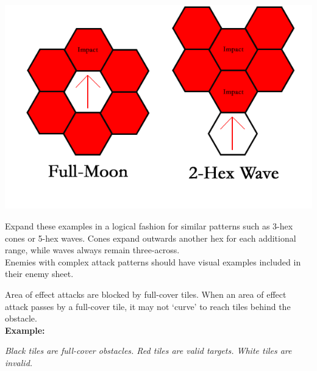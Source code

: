 \documentclass[12pt]{article}
\begin{document}
\begin{multicols*}{2}
\begin{center}
{\includegraphics[scale=0.37]{misc/aoes_3.png}}
\end{center}
Expand these examples in a logical fashion for similar patterns such as 3-hex cones or 5-hex waves. Cones expand outwards another hex for each additional range, while waves always remain three-across.\\
Enemies with complex attack patterns should have visual examples included in their enemy sheet.\\

\pagebreak

Area of effect attacks are blocked by full-cover tiles. When an area of effect attack passes by a full-cover tile, it may not ‘curve’ to reach tiles behind the obstacle.\\
\textbf{Example:}
\begin{center}
\emph{Black tiles are full-cover obstacles. Red tiles are valid targets. White tiles are invalid.}
\end{center}


\end{multicols*}
\end{document}

